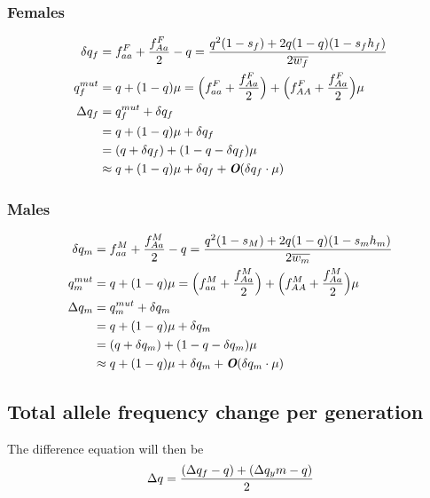 \documentclass[11pt]{article}
\def\mathbi#1{\textbf{\em #1}}
\begin{document}
\subsubsection{Females}
\begin{align*}
\delta q_f &= f^F_{aa} + \frac{f^F_{Aa}}{2} - q = \frac{q^{2}(1-s_f) + 2q(1-q)(1-s_f h_f)}{2 \overline{w_f}} \\
q^{mut}_{f} &= q + (1-q) \mu = \Big( f^F_{aa} + \frac{f^F_{Aa}}{2} \Big) +  \Big( f^F_{AA} + \frac{f^F_{Aa}}{2} \Big) \mu \\
\Delta q_f &= q^{mut}_{f} + \delta q_f \\
            &= q + (1-q) \mu + \delta q_f \\
            &= (q + \delta q_f) + (1 - q - \delta q_f) \mu \\
            &\approx q + (1-q) \mu + \delta q_f + \mathbi{O} (\delta q_f \cdot \mu) \\
\end{align*}

\subsubsection{Males}
\begin{align*}
\delta q_m &= f^M_{aa} + \frac{f^M_{Aa}}{2} - q = \frac{q^{2}(1-s_M) + 2q(1-q)(1-s_m h_m)}{2 \overline{w_m}} \\
q^{mut}_{m} &= q + (1-q) \mu = \Big( f^M_{aa} + \frac{f^M_{Aa}}{2} \Big) +  \Big( f^M_{AA} + \frac{f^M_{Aa}}{2} \Big) \mu \\
\Delta q_m &= q^{mut}_{m} + \delta q_m \\
            &= q + (1-q) \mu + \delta q_m \\
            &= (q + \delta q_m) + (1 - q - \delta q_m) \mu \\
            &\approx q + (1-q) \mu + \delta q_m + \mathbi{O} (\delta q_m \cdot \mu) \\
\end{align*}


\subsection*{Total allele frequency change per generation}

The difference equation will then be
\begin{equation*}
\Delta q = \frac{(\Delta q_f - q) + (\Delta q_ym - q)}{2} \\
\end{equation*}
\end{document}
